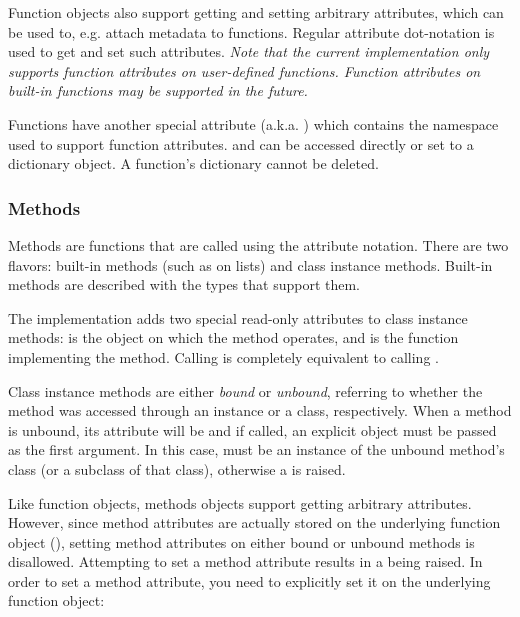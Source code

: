 Function objects also support getting and setting arbitrary
attributes, which can be used to, e.g. attach metadata to functions.
Regular attribute dot-notation is used to get and set such
attributes. \emph{Note that the current implementation only supports
function attributes on user-defined functions.  Function attributes on
built-in functions may be supported in the future.}

Functions have another special attribute 
(a.k.a. ) which contains the namespace used to
support function attributes.   and  can
be accessed directly or set to a dictionary object.  A function's
dictionary cannot be deleted.

\subsubsection{Methods \label{typesmethods}}

Methods are functions that are called using the attribute notation.
There are two flavors: built-in methods (such as  on
lists) and class instance methods.  Built-in methods are described
with the types that support them.

The implementation adds two special read-only attributes to class
instance methods:  is the object on which the
method operates, and  is the function
implementing the method.  Calling  is completely equivalent to
calling .

Class instance methods are either \emph{bound} or \emph{unbound},
referring to whether the method was accessed through an instance or a
class, respectively.  When a method is unbound, its 
attribute will be  and if called, an explicit 
object must be passed as the first argument.  In this case,
 must be an instance of the unbound method's class (or a
subclass of that class), otherwise a  is raised.

Like function objects, methods objects support getting
arbitrary attributes.  However, since method attributes are actually
stored on the underlying function object (),
setting method attributes on either bound or unbound methods is
disallowed.  Attempting to set a method attribute results in a
 being raised.  In order to set a method attribute,
you need to explicitly set it on the underlying function object:

